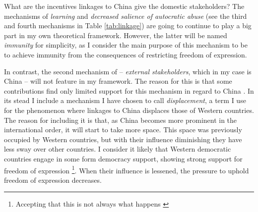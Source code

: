 What are the incentives linkages to China give the domestic stakeholders? The mechanisms of \textit{learning} and \textit{decreased salience of autocratic abuse} (see the third and fourth mechanisms in Table \ref{tab:linkage}) are going to continue to play a big part in my own theoretical framework. However, the latter will be named \textit{immunity} for simplicity, as I consider the main purpose of this mechanism to be to achieve immunity from the consequences of restricting freedom of expression.

In contrast, the second mechanism of \citeauthor{tansey_ties_2017} -- \textit{external stakeholders}, which in my case is China -- will not feature in my framework. The reason for this is that some contributions find only limited support for this mechanism in regard to China \citep{chen_democracy_2015}. In its stead I include a mechanism I have chosen to call \textit{displacement}, a term I use for the phenomenon where linkages to China displaces those of Western countries. The reason for including it is that, as China becomes more prominent in the international order, it will start to take more space. This space was previously occupied by Western countries, but with their influence diminishing they have less sway over other countries. I consider it likely that Western democratic countries engage in some form democracy support, showing strong support for freedom of expression \citep{levitsky_linkage_2006}\footnote{Accepting that this is not always what happens \citep{chen_democracy_2015, wong_chinese_2019}}. When their influence is lessened, the pressure to uphold freedom of expression decreases.

